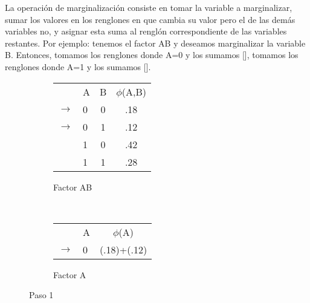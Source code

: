 La operación de marginalización consiste en tomar la variable a marginalizar, sumar los valores en los renglones en que cambia su valor pero el de las demás variables no, y asignar esta suma al renglón correspondiente de las variables restantes. Por ejemplo: tenemos el factor AB y deseamos marginalizar la variable B. Entonces, tomamos los renglones donde A=0 y los sumamos [], tomamos los renglones donde A=1 y los sumamos [].

\begin{figure}[H]
    \centering
    \begin{subfigure}[b]{0.4\textwidth}
        \centering
        \begin{tabular}{ l l  c | c }
           & A & B & $\phi$(A,B)\\ \cline{2-4}
          \(\to\) & 0 & 0 & .18  \\ \cline{2-4}
          \(\to\) & 0 & 1 & .12  \\ \cline{2-4}
           & 1 & 0 & .42  \\ \cline{2-4}
           & 1 & 1 & .28  \\
        \end{tabular}
        \caption{Factor AB}
    \end{subfigure}
    ~ 
    \begin{subfigure}[b]{0.4\textwidth}
        \centering
        \begin{tabular}{l  l | c }
            & A & $\phi$(A)\\ \cline{2-3}
        \(\to\) & 0 & (.18)+(.12)  \\
        \end{tabular}
        \caption{Factor A}
    \end{subfigure}
    \caption{Paso 1}\label{fig:MargA}
\end{figure}


